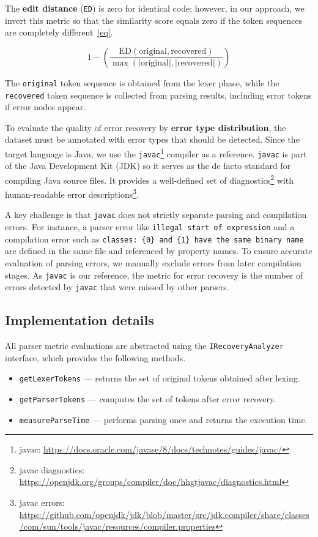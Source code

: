 \documentclass[conference]{IEEEtran}
\begin{document}
The \textbf{edit distance} (\texttt{ED}) is zero for identical code; however, in our approach, we invert this metric so that the similarity score equals zero if the token sequences are completely different~\eqref{eq}.

\begin{equation}
 1 - \left( \frac{\text{ED}(\text{original}, \text{recovered})}{\max(|\text{original}|, |\text{recovered}|)} \right)\label{eq}
\end{equation}

 The \texttt{original} token sequence is obtained from the lexer phase, while the \texttt{recovered} token sequence is collected from parsing results, including error tokens if error nodes appear.


To evaluate the quality of error recovery by \textbf{error type distribution}, the dataset must be annotated with error types that should be detected. Since the target language is Java, we use the \texttt{javac}\footnote{javac: \url{https://docs.oracle.com/javase/8/docs/technotes/guides/javac/}} compiler as a reference. \texttt{javac} is part of the Java Development Kit (JDK) so it serves as the de facto standard for compiling Java source files. It provides a well-defined set of diagnostics\footnote{javac diagnostics: \\ \url{https://openjdk.org/groups/compiler/doc/hhgtjavac/diagnostics.html}} with human-readable error descriptions\footnote{javac errors: \url{https://github.com/openjdk/jdk/blob/master/src/jdk.compiler/share/classes/com/sun/tools/javac/resources/compiler.properties}}.

A key challenge is that \texttt{javac} does not strictly separate parsing and compilation errors. For instance, a parser error like \texttt{illegal start of expression} and a compilation error such as \texttt{classes: \{0\} and \{1\} have the same binary name} are defined in the same file and referenced by property names. To ensure accurate evaluation of parsing errors, we manually exclude errors from later compilation stages. As \texttt{javac} is our reference, the metric for error recovery is the number of errors detected by \texttt{javac} that were missed by other parsers.

\subsection{Implementation details}
All parser metric evaluations are abstracted using the \texttt{IRecoveryAnalyzer} interface, which provides the following methods.
\begin{itemize}
    \item \texttt{getLexerTokens} --- returns the set of original tokens obtained after lexing.
    \item \texttt{getParserTokens} --- computes the set of tokens after error recovery.
    \item \texttt{measureParseTime} --- performs parsing once and returns the execution time.
\end{itemize}
\end{document}
